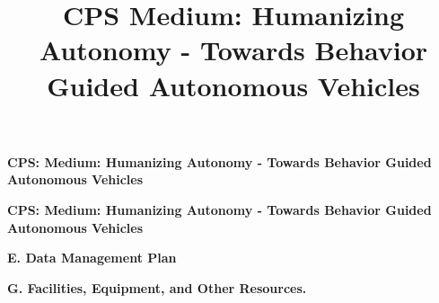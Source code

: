 \documentclass{article}
\title{CPS Medium: Humanizing Autonomy - Towards Behavior Guided Autonomous Vehicles}
\begin{document}
\maketitle

\thispagestyle{empty}

\newpage

\renewcommand{\thepage}{A-\arabic{page}}
\setcounter{page}{1}
\centerline{\Large\bf CPS: Medium: Humanizing Autonomy - Towards Behavior Guided Autonomous Vehicles}


\newpage
\renewcommand{\thepage}{B-\arabic{page}}
\setcounter{page}{1}
\tableofcontents
{} 

\newpage

\renewcommand{\thepage}{C-\arabic{page}}
\setcounter{page}{1}
\centerline{\Large\bf CPS: Medium: Humanizing Autonomy - Towards Behavior Guided Autonomous Vehicles}







\newpage
\renewcommand{\thepage}{D-\arabic{page}}
\setcounter{page}{1}



\newpage
\renewcommand{\thepage}{E-\arabic{page}}
\setcounter{page}{1}
\centerline{\Large\bf E. Data Management Plan}



\newpage
\renewcommand{\thepage}{G-\arabic{page}}
\setcounter{page}{1}
\centerline{\Large\bf G. Facilities, Equipment, and Other Resources.}
\vspace{0.3in}


% 
\end{document}
